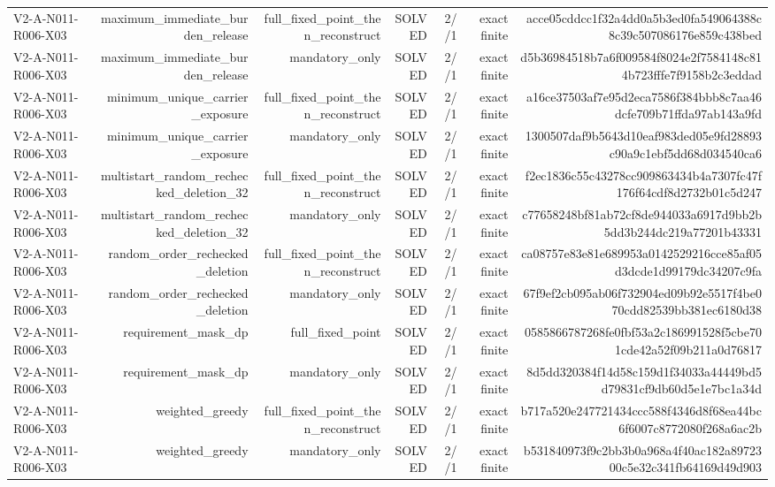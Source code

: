 {\begin{longtable}{lrrrrrr}
V2-A-N011-R006-X03 & maximum\_immediate\_burden\_release & full\_fixed\_point\_then\_reconstruct & SOLVED & 2//1 & exact finite & acce05cddcc1f32a4dd0a5b3ed0fa549064388c8c39c507086176e859c438bed \\
V2-A-N011-R006-X03 & maximum\_immediate\_burden\_release & mandatory\_only & SOLVED & 2//1 & exact finite & d5b36984518b7a6f009584f8024e2f7584148c814b723fffe7f9158b2c3eddad \\
V2-A-N011-R006-X03 & minimum\_unique\_carrier\_exposure & full\_fixed\_point\_then\_reconstruct & SOLVED & 2//1 & exact finite & a16ce37503af7e95d2eca7586f384bbb8c7aa46dcfe709b71ffda97ab143a9fd \\
V2-A-N011-R006-X03 & minimum\_unique\_carrier\_exposure & mandatory\_only & SOLVED & 2//1 & exact finite & 1300507daf9b5643d10eaf983ded05e9fd28893c90a9c1ebf5dd68d034540ca6 \\
V2-A-N011-R006-X03 & multistart\_random\_rechecked\_deletion\_32 & full\_fixed\_point\_then\_reconstruct & SOLVED & 2//1 & exact finite & f2ec1836c55c43278cc909863434b4a7307fc47f176f64cdf8d2732b01c5d247 \\
V2-A-N011-R006-X03 & multistart\_random\_rechecked\_deletion\_32 & mandatory\_only & SOLVED & 2//1 & exact finite & c77658248bf81ab72cf8de944033a6917d9bb2b5dd3b244dc219a77201b43331 \\
V2-A-N011-R006-X03 & random\_order\_rechecked\_deletion & full\_fixed\_point\_then\_reconstruct & SOLVED & 2//1 & exact finite & ca08757e83e81e689953a0142529216cce85af05d3dcde1d99179dc34207c9fa \\
V2-A-N011-R006-X03 & random\_order\_rechecked\_deletion & mandatory\_only & SOLVED & 2//1 & exact finite & 67f9ef2cb095ab06f732904ed09b92e5517f4be070cdd82539bb381ec6180d38 \\
V2-A-N011-R006-X03 & requirement\_mask\_dp & full\_fixed\_point & SOLVED & 2//1 & exact finite & 0585866787268fe0fbf53a2c186991528f5cbe701cde42a52f09b211a0d76817 \\
V2-A-N011-R006-X03 & requirement\_mask\_dp & mandatory\_only & SOLVED & 2//1 & exact finite & 8d5dd320384f14d58c159d1f34033a44449bd5d79831cf9db60d5e1e7bc1a34d \\
V2-A-N011-R006-X03 & weighted\_greedy & full\_fixed\_point\_then\_reconstruct & SOLVED & 2//1 & exact finite & b717a520e247721434ccc588f4346d8f68ea44bc6f6007c8772080f268a6ac2b \\
V2-A-N011-R006-X03 & weighted\_greedy & mandatory\_only & SOLVED & 2//1 & exact finite & b531840973f9c2bb3b0a968a4f40ac182a8972300c5e32c341fb64169d49d903 \\

\end{longtable}}
